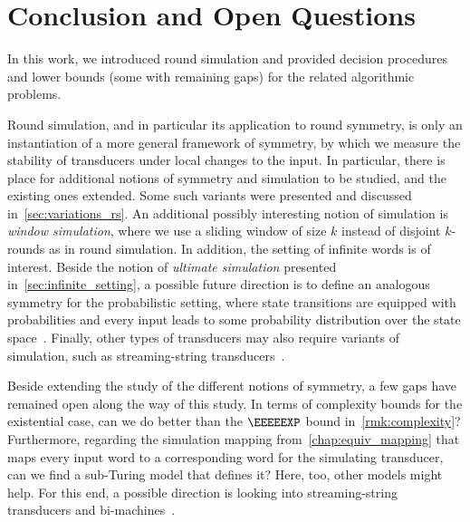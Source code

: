 \chapter{Conclusion and Open Questions}
\label{chap:conclusion}
\label{chap:discussion}
\label{chap:future}
 
In this work, we introduced round simulation and provided decision procedures and lower bounds (some with remaining gaps) for the related algorithmic problems.

Round simulation, and in particular its application to round symmetry, is only an instantiation of a more general framework of symmetry, by which we measure the stability of transducers under local changes to the input. In particular, there is place for additional notions of symmetry and simulation to be studied, and the existing ones extended. Some such variants were presented and discussed in~\cref{sec:variations_rs}. An additional possibly interesting notion of simulation is \emph{window simulation}, where we use a sliding window of size $k$ instead of disjoint $k$-rounds as in round simulation.
In addition, the setting of infinite words is of interest. Beside the notion of \emph{ultimate simulation} presented in~\cref{sec:infinite_setting}, a possible future direction is to define an analogous symmetry for the probabilistic setting, where state transitions are equipped with probabilities and every input leads to some probability distribution over the state space~\cite{Almagor2020b}.
Finally, other types of transducers may also require variants of simulation, such as streaming-string transducers~\cite{Alur2010}.

Beside extending the study of the different notions of symmetry, a few gaps have remained open along the way of this study. In terms of complexity bounds for the existential case, can we do better than the $\EEEEEXP$ bound in~\cref{rmk:complexity}?
Furthermore, regarding the simulation mapping from~\cref{chap:equiv_mapping} that maps every input word to a corresponding word for the simulating transducer, can we find a sub-Turing model that defines it? Here, too, other models might help. For this end, a possible direction is looking into streaming-string transducers and bi-machines~\cite{Muscholl}.
